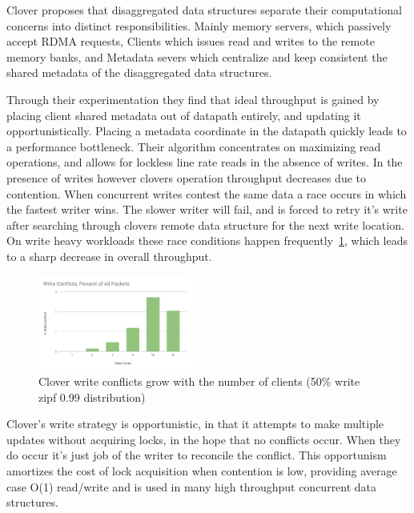 
Clover proposes that disaggregated data structures separate their
computational concerns into distinct responsibilities. Mainly memory
servers, which passively accept RDMA requests, Clients which issues read and
writes to the remote memory banks, and Metadata severs which
centralize and keep consistent the shared metadata of the disaggregated
data structures.

Through their experimentation they find that ideal throughput is
gained by placing client shared metadata out of datapath entirely, and
updating it opportunistically. Placing a metadata coordinate in the
datapath quickly leads to a performance bottleneck. Their algorithm
concentrates on maximizing read operations, and allows for lockless
line rate reads in the absence of writes. In the presence of writes
however clovers operation throughput decreases due to contention. When
concurrent writes contest the same data a race occurs in which the
fastest writer wins. The slower writer will fail, and is forced to
retry it's write after searching through clovers remote data structure
for the next write location. On write heavy workloads these race
conditions happen frequently~\ref{fig:conflicts}, which leads to a
sharp decrease in overall throughput.

\begin{figure}
    \includegraphics[width=0.45\textwidth]{fig/write_conflicts.pdf}
    \caption{Clover write conflicts grow with the number of clients
    (50\% write zipf 0.99 distribution)}
    \label{fig:conflicts}
\end{figure}


Clover's write strategy is opportunistic, in that it attempts to make
multiple updates without acquiring locks, in the hope that no conflicts
occur. When they do occur it's just job of the writer to reconcile the
conflict. This opportunism amortizes the cost of lock acquisition when
contention is low, providing average case O(1) read/write and is used
in many high throughput concurrent data structures.


